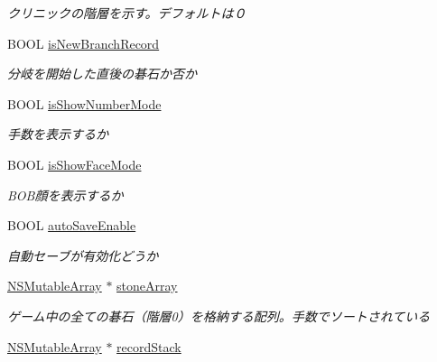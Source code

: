 \begin{DoxyCompactItemize}
\begin{DoxyCompactList}\small\item\em クリニックの階層を示す。デフォルトは０ \end{DoxyCompactList}\item 
\hypertarget{interface_games_a703b51f88f07e90dcedc96ba2205fad2}{
BOOL \hyperlink{interface_games_a703b51f88f07e90dcedc96ba2205fad2}{isNewBranchRecord}}
\label{interface_games_a703b51f88f07e90dcedc96ba2205fad2}

\begin{DoxyCompactList}\small\item\em 分岐を開始した直後の碁石か否か \end{DoxyCompactList}\item 
\hypertarget{interface_games_a06655ec0a7ec764af915a37e86c03a32}{
BOOL \hyperlink{interface_games_a06655ec0a7ec764af915a37e86c03a32}{isShowNumberMode}}
\label{interface_games_a06655ec0a7ec764af915a37e86c03a32}

\begin{DoxyCompactList}\small\item\em 手数を表示するか \end{DoxyCompactList}\item 
\hypertarget{interface_games_a7dfdfdbff61a6e7985fde0cba2c2fa79}{
BOOL \hyperlink{interface_games_a7dfdfdbff61a6e7985fde0cba2c2fa79}{isShowFaceMode}}
\label{interface_games_a7dfdfdbff61a6e7985fde0cba2c2fa79}

\begin{DoxyCompactList}\small\item\em BOB顔を表示するか \end{DoxyCompactList}\item 
\hypertarget{interface_games_ad5eb3884caccccce5c0e732331888e31}{
BOOL \hyperlink{interface_games_ad5eb3884caccccce5c0e732331888e31}{autoSaveEnable}}
\label{interface_games_ad5eb3884caccccce5c0e732331888e31}

\begin{DoxyCompactList}\small\item\em 自動セーブが有効化どうか \end{DoxyCompactList}\item 
\hypertarget{interface_games_a9c5b953f8926d3c38fd932edec0aeb30}{
\hyperlink{class_n_s_mutable_array}{NSMutableArray} $\ast$ \hyperlink{interface_games_a9c5b953f8926d3c38fd932edec0aeb30}{stoneArray}}
\label{interface_games_a9c5b953f8926d3c38fd932edec0aeb30}

\begin{DoxyCompactList}\small\item\em ゲーム中の全ての碁石（階層0）を格納する配列。手数でソートされている \end{DoxyCompactList}\item 
\hypertarget{interface_games_aebe294475787b67c8aa8ac4c5a75e861}{
\hyperlink{class_n_s_mutable_array}{NSMutableArray} $\ast$ \hyperlink{interface_games_aebe294475787b67c8aa8ac4c5a75e861}{recordStack}}
\label{interface_games_aebe294475787b67c8aa8ac4c5a75e861}


\end{DoxyCompactItemize}
